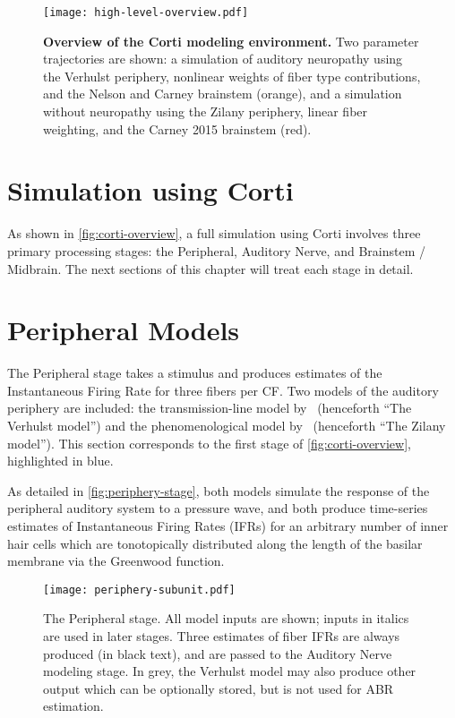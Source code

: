 \begin{figure}[htbp]
	\centering
	\texttt{[image: high-level-overview.pdf]}
	\caption[Overview of the Corti Modeling Environment.]{\textbf{Overview of the Corti modeling environment.} Two parameter trajectories are shown: a simulation of auditory neuropathy using the Verhulst periphery, nonlinear weights of fiber type contributions, and the Nelson and Carney brainstem (orange), and a simulation without neuropathy using the Zilany periphery, linear fiber weighting, and the Carney 2015 brainstem (red).}
	\label{fig:corti-overview}
	\end{figure}

\section{Simulation using Corti} %
\label{sec:simulation_using_corti}
As shown in \autoref{fig:corti-overview}, a full simulation using Corti involves three primary processing stages: the Peripheral, Auditory Nerve, and Brainstem / Midbrain. The next sections of this chapter will treat each stage in detail. 

\section{Peripheral Models} %
\label{sec:peripheral_models}
The Peripheral stage takes a stimulus and produces estimates of the Instantaneous Firing Rate for three fibers per CF.  Two models of the auditory periphery are included: the transmission-line model by~\cite{Verhulst2015Functional} (henceforth ``The Verhulst model'') and the phenomenological model by~\cite{Zilany2014Updated} (henceforth ``The Zilany model'').  This section corresponds to the first stage of \autoref{fig:corti-overview}, highlighted in blue.

As detailed in \autoref{fig:periphery-stage}, both models simulate the response of the peripheral auditory system to a pressure wave, and both produce time-series estimates of Instantaneous Firing Rates (IFRs) for an arbitrary number of inner hair cells which are tonotopically distributed along the length of the basilar membrane via the Greenwood function.


\begin{figure}[htbp]
	\centering
	\texttt{[image: periphery-subunit.pdf]}
	\caption[The Peripheral Stage]{The Peripheral stage. All model inputs are shown; inputs in italics are used in later stages.  Three estimates of fiber IFRs are always produced (in black text), and are passed to the Auditory Nerve modeling stage.  In grey, the Verhulst model may also produce other output which can be optionally stored, but is not used for ABR estimation. }
	\label{fig:periphery-stage}
\end{figure}

